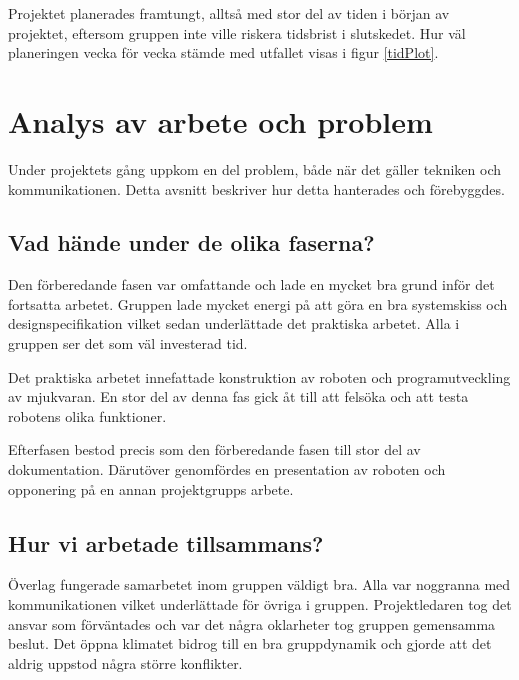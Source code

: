 \documentclass[11pt]{article}
\begin{document}
Projektet planerades framtungt, alltså med stor del av tiden i början av projektet, eftersom gruppen inte ville riskera tidsbrist i slutskedet. Hur väl planeringen vecka för vecka stämde med utfallet visas i figur \ref{tidPlot}.








\pagebreak

\section{Analys av arbete och problem}
Under projektets gång uppkom en del problem, både när det gäller tekniken och kommunikationen. Detta avsnitt beskriver hur detta hanterades och förebyggdes. 

\subsection{Vad hände under de olika faserna?}
Den förberedande fasen var omfattande och lade en mycket bra grund inför det fortsatta arbetet. Gruppen lade mycket energi på att göra en bra systemskiss och designspecifikation vilket sedan underlättade det praktiska arbetet. Alla i gruppen ser det som väl investerad tid.

Det praktiska arbetet innefattade konstruktion av roboten och programutveckling av mjukvaran. En stor del av denna fas gick åt till att felsöka och att testa robotens olika funktioner. 

Efterfasen bestod precis som den förberedande fasen till stor del av dokumentation. Därutöver genomfördes en presentation av roboten och opponering på en annan projektgrupps arbete.

\subsection{Hur vi arbetade tillsammans?}
Överlag fungerade samarbetet inom gruppen väldigt bra. Alla var noggranna med kommunikationen vilket underlättade för övriga i gruppen. Projektledaren tog det ansvar som förväntades och var det några oklarheter tog gruppen gemensamma beslut. Det öppna klimatet bidrog till en bra gruppdynamik och gjorde att det aldrig uppstod några större konflikter.
\end{document}
